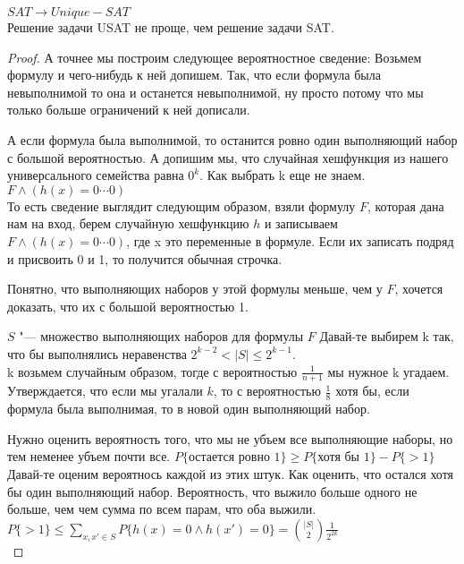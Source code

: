 \begin{theorem}
	$SAT \to Unique-SAT$\\
	Решение задачи USAT не проще, чем решение задачи SAT.
\end{theorem}
\begin{proof}
	А точнее мы построим следующее вероятностное сведение:
	Возьмем формулу и чего-нибудь к ней допишем. Так, что если формула
	была невыполнимой то она и останется невыполнимой, ну просто потому что мы только больше ограничений к ней 
	дописали.

	А если формула была выполнимой, то останится ровно один выполняющий набор с большой вероятностью.  
	А допишим мы, что случайная хешфункция из нашего универсального семейства равна $0^k$. Как выбрать k еще не знаем.
	$F \wedge (h(x) = 0\cdots0)$\\

	То есть сведение выглядит следующим образом, взяли формулу $F$, которая дана нам на вход, берем случайную
	хешфункцию $h$ и записываем  $F \wedge (h(x) = 0\cdots0)$, где x это переменные в формуле. Если их записать подряд и 
	присвоить 0 и 1, то получится обычная строчка. 

	Понятно, что выполняющих наборов у этой формулы меньше, чем у $F$, хочется доказать, что их с большой вероятностью 1.	

	$S$ "--- множество выполняющих наборов для формулы $F$
	Давай-те выбирем k так, что бы выполнялись неравенства $2^{k - 2} < |S| \le 2^{k - 1}$.\\

	k возьмем случайным образом, тогде с вероятностью $\frac{1}{n + 1}$ мы нужное k угадаем.\\

	Утверждается, что если мы угалали $k$, то с вероятностью $\frac{1}{8}$ хотя бы, если формула была 
	выполнимая, то в новой один выполняющий набор.

	Нужно оценить вероятность того, что мы не убъем все выполняющие наборы, но тем неменее убъем почти все. 
	$P\{\text{остается ровно 1}\} \ge P\{\text{хотя бы 1}\} - P\{> 1\}$\\
	
	Давай-те оценим вероятнось каждой из этих штук. Как оценить, что остался хотя бы один выполняющий набор.
	Вероятность, что выжило больше одного не больше, чем чем сумма по всем парам, что оба выжили.
	$P\{> 1\} \le \sum_{x,x' \in S} P\{h(x) = 0 \wedge h(x') = 0\} = \binom{|S|}{2}\frac{1}{2^{2k}}$\\


\end{proof}
